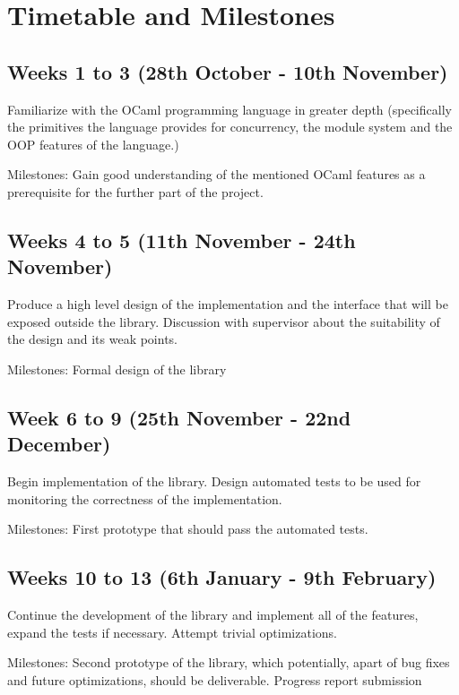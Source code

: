 \section*{Timetable and Milestones}

\subsection*{Weeks 1 to 3 (28th October - 10th November)}

Familiarize with the OCaml programming language in greater depth (specifically the primitives the language provides for concurrency, the module system and the OOP features of the language.) 

Milestones: Gain good understanding of the mentioned OCaml features as a prerequisite for the further part of the project. 


\subsection*{Weeks 4 to 5 (11th November - 24th November)}

Produce a high level design of the implementation and the interface that will be exposed outside the library. Discussion with supervisor about the suitability of the design and its weak points.

Milestones: Formal design of the library

\subsection*{Week 6 to 9 (25th November - 22nd December)}

Begin implementation of the library. Design automated tests to be used for monitoring the correctness of the implementation.

Milestones: First prototype that should pass the automated tests.

\subsection*{Weeks 10 to 13 (6th January - 9th February)}

Continue the development of the library and implement all of the features, expand the tests if necessary. Attempt trivial optimizations.

Milestones: Second prototype of the library, which potentially, apart of bug fixes and future optimizations, should be deliverable. Progress report submission  

